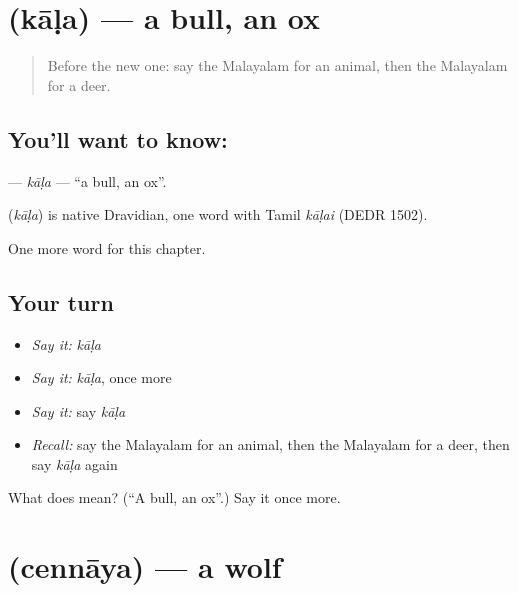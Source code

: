 \section[\texorpdfstring{\ml{കാള} (kāḷa)}{കാള (kāḷa)}]{ (kāḷa) — a bull, an ox}

\label{lesson:ML-C291-kala3}



\begin{quote}
Before the new one: say the Malayalam for an animal, then the Malayalam for a deer.
\end{quote}

\subsection*{You'll want to know: }
\textbf{} — \emph{kāḷa} — \textquotedblleft{}a bull, an ox\textquotedblright{}.

\begin{cousinweb}
\textbf{} (\emph{kāḷa}) is native Dravidian, one word with Tamil \emph{kāḷai} (DEDR 1502).
\end{cousinweb}

\begin{grammarlens}[title={What you've built}]
One more word for this chapter.
\end{grammarlens}

\subsection*{Your turn}
\begin{itemize}
\raggedright
  \item \emph{Say it:} \emph{kāḷa}
  \item \emph{Say it:} \emph{kāḷa}, once more
  \item \emph{Say it:} say \emph{kāḷa}
  \item \emph{Recall:} say the Malayalam for an animal, then the Malayalam for a deer, then say \emph{kāḷa} again
\end{itemize}

\begin{tcolorbox}[breakable,colback=teal!4,colframe=teal!35!black,title={Before you move on}]
What does  mean? (\textquotedblleft{}A bull, an ox\textquotedblright{}.) Say it once more.
\end{tcolorbox}
\section[\texorpdfstring{\ml{ചെന്നായ} (cennāya)}{ചെന്നായ (cennāya)}]{ (cennāya) — a wolf}

